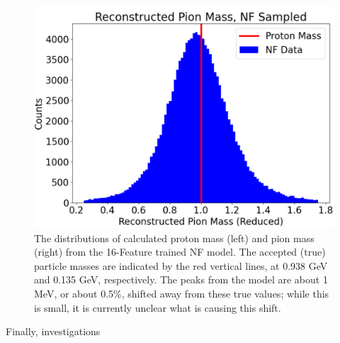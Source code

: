 \begin{figure}[H]
\begin{minipage}{0.421245\textwidth}
                \includegraphics[width=.97\textwidth,trim={ 0 0 0 0},clip]{Chapters/Ch3-Simulations/normalizing_flows/pics/FinalPictures/updated_pion_reduced.png}
            \end{minipage}
                \caption[Generated Proton and Pion Mass Distributions]{The distributions of calculated proton mass (left) and pion mass (right) from the 16-Feature trained NF model.  The accepted (true) particle masses are indicated by the red vertical lines, at 0.938 GeV and 0.135 GeV, respectively.
                The peaks from the model are about 1 MeV, or about 0.5\%, shifted away from these true values; while this is small, it is currently unclear what is causing this shift.}
            \label{fig:protonspions}
        \end{figure}
        

        Finally, investigations


